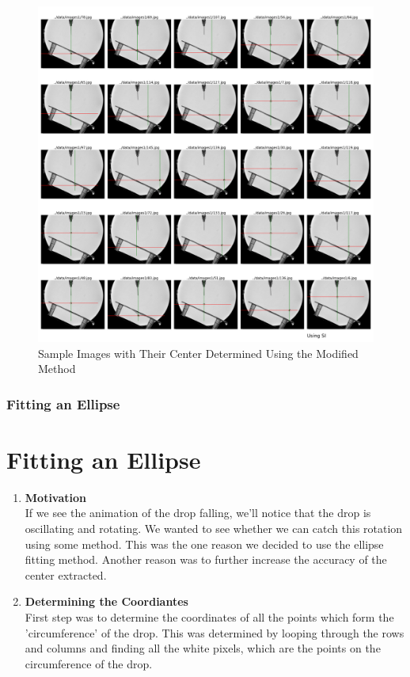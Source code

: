 \documentclass{beamer}
\begin{document}
\begin{frame}
    \begin{figure}
        \centering
        \includegraphics[scale=0.10]{using_si.png}
        \caption{Sample Images with Their Center Determined Using the Modified Method}
    \end{figure}
\end{frame}
\begin{frame}
    \frametitle{Fitting an Ellipse}
    \section{Fitting an Ellipse}
    \begin{enumerate}
        \item <1-> \textbf{Motivation}\\
              If we see the animation of the drop falling, we'll notice that the drop is oscillating and rotating. We wanted to see whether we can catch this rotation using some method. This was the one reason we decided to use the ellipse fitting method. Another reason was to further increase the accuracy of the center extracted.
        \item <2-> \textbf{Determining the Coordiantes}\\
              First step was to determine the coordinates of all the points which form the 'circumference' of the drop. This was determined by looping through the rows and columns and finding all the white pixels, which are the points on the circumference of the drop.
    \end{enumerate}
\end{frame}
\end{document}
